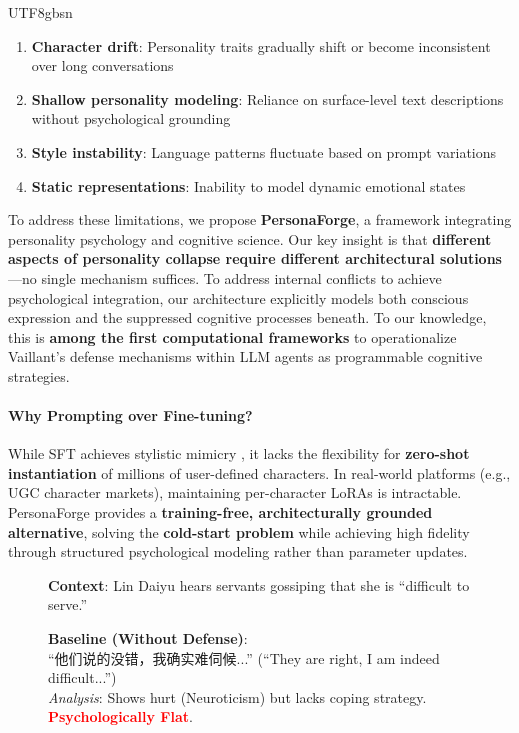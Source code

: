 \documentclass[11pt]{article}
\begin{document}
\begin{CJK*}{UTF8}{gbsn}
\begin{enumerate}
    \item \textbf{Character drift}: Personality traits gradually shift or become inconsistent over long conversations
    \item \textbf{Shallow personality modeling}: Reliance on surface-level text descriptions without psychological grounding
    \item \textbf{Style instability}: Language patterns fluctuate based on prompt variations
    \item \textbf{Static representations}: Inability to model dynamic emotional states
\end{enumerate}

To address these limitations, we propose \textbf{PersonaForge}, a framework integrating personality psychology and cognitive science. Our key insight is that \textbf{different aspects of personality collapse require different architectural solutions}---no single mechanism suffices. To address internal conflicts to achieve psychological integration, our architecture explicitly models both conscious expression and the suppressed cognitive processes beneath. To our knowledge, this is \textbf{among the first computational frameworks} to operationalize Vaillant's defense mechanisms within LLM agents as programmable cognitive strategies.

\paragraph{Why Prompting over Fine-tuning?} While SFT achieves stylistic mimicry \citep{shao2023character}, it lacks the flexibility for \textbf{zero-shot instantiation} of millions of user-defined characters. In real-world platforms (e.g., UGC character markets), maintaining per-character LoRAs is intractable. PersonaForge provides a \textbf{training-free, architecturally grounded alternative}, solving the \textbf{cold-start problem} while achieving high fidelity through structured psychological modeling rather than parameter updates.

\begin{figure}[t]
\centering
\begin{tcolorbox}[colback=gray!10, colframe=black!70, title=\textbf{Case Study: Psychological Defense Mechanism}]
\small
\textbf{Context}: Lin Daiyu hears servants gossiping that she is ``difficult to serve.''

\medskip
\textbf{Baseline (Without Defense)}: \\
``他们说的没错，我确实难伺候...'' (``They are right, I am indeed difficult...'') \\
\textit{Analysis}: Shows hurt (Neuroticism) but lacks coping strategy. \textcolor{red}{\textbf{Psychologically Flat}}.


\end{tcolorbox}
\end{figure}
\end{CJK*}
\end{document}
